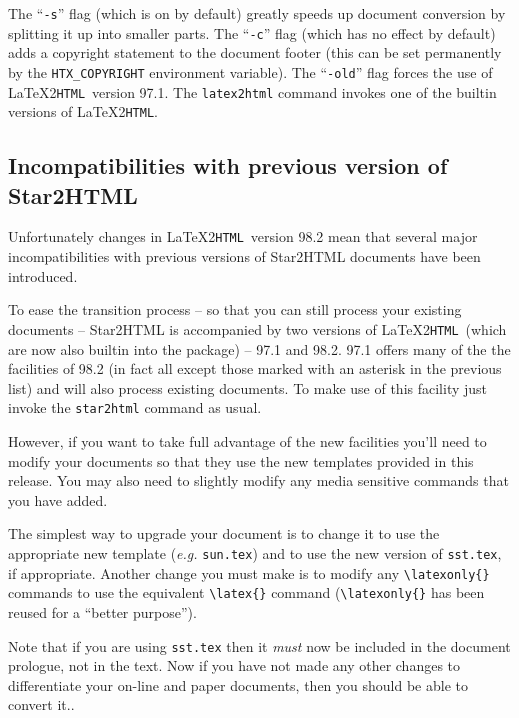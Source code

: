 \documentclass[twoside,11pt]{article}
\newcommand{\htmlref}[2]{#1}
\newcommand{\latex}[1]{#1}
\newcommand{\latextohtml}{\LaTeX2\texttt{HTML}}
\renewcommand{\_}{\texttt{\symbol{95}}}
\begin{document}
The ``\verb#-s#'' flag (which is on by default) greatly speeds up
document conversion by splitting it up into smaller parts.
The ``\verb#-c#'' flag (which has no effect by default) adds a
copyright statement to the document footer (this can be set
permanently by the \verb#HTX_COPYRIGHT# environment variable).
The ``\verb#-old#'' flag forces the use of \latextohtml\ version
97.1. The \verb#latex2html# command invokes one of the builtin
versions of \latextohtml.

\subsection{Incompatibilities with previous version of Star2HTML}

Unfortunately changes in \latextohtml\ version 98.2 mean that several
major incompatibilities with previous versions of Star2HTML documents
have been introduced. 

To ease the transition process -- so that you can still process your
existing documents -- Star2HTML is accompanied by two versions of
\latextohtml\ (which are now also builtin into the package) -- 97.1
and 98.2. 97.1 offers many of the the facilities of 98.2 (in fact all
except those marked with an asterisk in the previous
\htmlref{list}{changes13}) and will also process
existing documents. To make use of this facility just invoke the
\verb#star2html# command as usual.

However, if you want to take full advantage of the new facilities
you'll need to modify your documents so that they use the new
templates provided in this release. You may also need to slightly
modify any media sensitive commands that you have added.

The simplest way to upgrade your document is to change it to use the
appropriate new template (\textit{e.g.} \verb#sun.tex#) and to use the
new version of \verb#sst.tex#, if appropriate. Another change you must
make is to modify any \verb#\latexonly{}# commands to use the
equivalent \verb#\latex{}# command (\verb#\latexonly{}# has been
reused for a ``better purpose'').

Note that if you are using \verb#sst.tex# then it \emph{must} now be
included in the document prologue, not in the text. Now if you have
not made any other changes to differentiate your on-line and paper
documents, then you should be able to convert it..
\end{document}
